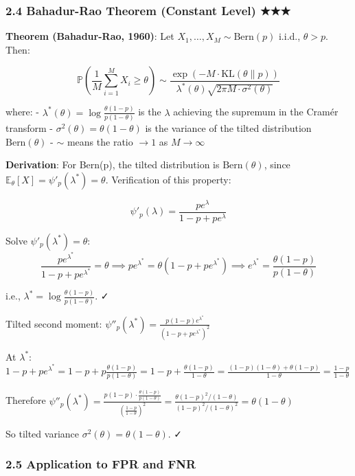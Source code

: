\documentclass[
  12pt,
]{article}
\begin{document}
\subsubsection{2.4 Bahadur-Rao Theorem (Constant Level) ★★★}\label{bahadur-rao-theorem-constant-level}

\textbf{Theorem (Bahadur-Rao, 1960)}: Let \(X_1, \dots, X_M \sim \text{Bern}(p)\) i.i.d., \(\theta > p\). Then:

\[\mathbb{P}\left(\frac{1}{M}\sum_{i=1}^M X_i \geq \theta\right) \sim \frac{\exp(-M \cdot \text{KL}(\theta \| p))}{\lambda^*(\theta) \sqrt{2\pi M \cdot \sigma^2(\theta)}}\]

where: - \(\lambda^*(\theta) = \log\frac{\theta(1-p)}{p(1-\theta)}\) is the \(\lambda\) achieving the supremum in the Cramér transform - \(\sigma^2(\theta) = \theta(1-\theta)\) is the variance of the tilted distribution \(\text{Bern}(\theta)\) - \(\sim\) means the ratio \(\to 1\) as \(M \to \infty\)

\textbf{Derivation}: For Bern(p), the tilted distribution is \(\text{Bern}(\theta)\), since \(\mathbb{E}_{\theta}[X] = \psi'_p(\lambda^*) = \theta\). Verification of this property:

\[\psi'_p(\lambda) = \frac{pe^\lambda}{1-p+pe^\lambda}\]

Solve \(\psi'_p(\lambda^*) = \theta\):
\[\frac{pe^{\lambda^*}}{1-p+pe^{\lambda^*}} = \theta \implies pe^{\lambda^*} = \theta(1-p+pe^{\lambda^*}) \implies e^{\lambda^*} = \frac{\theta(1-p)}{p(1-\theta)}\]

i.e., \(\lambda^* = \log\frac{\theta(1-p)}{p(1-\theta)}\). ✓

Tilted second moment: \(\psi''_p(\lambda^*) = \frac{p(1-p)e^{\lambda^*}}{(1-p+pe^{\lambda^*})^2}\)

At \(\lambda^*\): \(1-p+pe^{\lambda^*} = 1-p + p\frac{\theta(1-p)}{p(1-\theta)} = 1-p + \frac{\theta(1-p)}{1-\theta} = \frac{(1-p)(1-\theta) + \theta(1-p)}{1-\theta} = \frac{1-p}{1-\theta}\)

Therefore \(\psi''_p(\lambda^*) = \frac{p(1-p) \cdot \frac{\theta(1-p)}{p(1-\theta)}}{(\frac{1-p}{1-\theta})^2} = \frac{\theta(1-p)^2/(1-\theta)}{(1-p)^2/(1-\theta)^2} = \theta(1-\theta)\)

So tilted variance \(\sigma^2(\theta) = \theta(1-\theta)\). ✓

\subsubsection{2.5 Application to FPR and FNR}\label{application-to-fpr-and-fnr}
\end{document}
